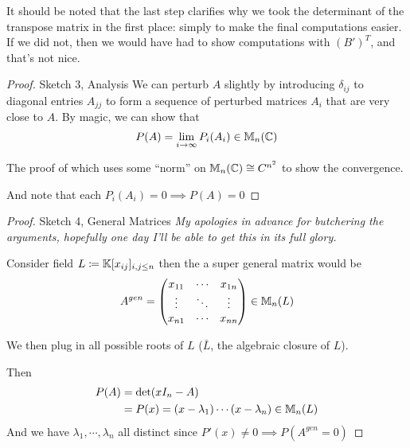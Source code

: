 \begin{remark}
    It should be noted that the last step clarifies why we took the determinant of the transpose matrix in the first place: simply to make the final computations easier. If we did not, then we would have had to show computations with \((B')^T\), and that's not nice.
\end{remark}

\begin{proof} {Sketch 3, Analysis}
    We can perturb \(A\) slightly by introducing \(\delta_{ij}\) to diagonal entries \(A_{jj}\) to form a sequence of perturbed matrices \(A_i\) that are very close to \(A\). By magic, we can show that \[
        P(A) = \lim_{i \to \infty} P_i(A_i) \in \mathbb{M}_n(\mathbb{C})
    \]

    The proof of which uses some ``norm'' on \(\mathbb{M}_n(\mathbb{C}) \cong C^{n^2}\) to show the convergence.

    And note that each \(P_i(A_i) = 0 \implies P(A) = 0\)
\end{proof}

\begin{proof} {Sketch 4, General Matrices}
    \textit{My apologies in advance for butchering the arguments, hopefully one day I'll be able to get this in its full glory.}

    Consider field \(L \coloneqq \mathbb{K}[x_{ij}]_{i, j \leq n}\) then the a super general matrix would be \[
        A^{gen} = \begin{pmatrix}
            x_{11} & \cdots & x_{1n} \\
            \vdots & \ddots & \vdots \\
            x_{n1} & \cdots & x_{nn}
        \end{pmatrix} \in \mathbb{M}_n(L)
    \]

    We then plug in all possible roots of \(L\) (\(\bar{L}\), the algebraic closure of \(L\)).

    Then \begin{align*}
        P(A) & = \det(x I_n - A)                                             \\
             & = P(x) = (x - \lambda_1) \cdots (x - \lambda_n) \in \mathbb{M}_n(L)
    \end{align*}
    And we have \(\lambda_1, \cdots, \lambda_n\) all distinct since \(P'(x) \neq 0 \implies P(A^{gen} = 0)\)
\end{proof}

